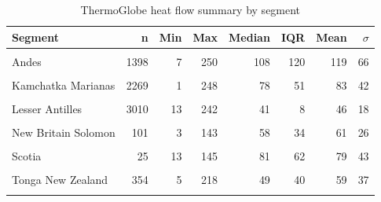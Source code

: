 \begin{table}

\caption{\label{tab:hfSummaryTable}ThermoGlobe heat flow summary by segment}
\centering
\begin{threeparttable}
\begin{tabular}[t]{lrrrrrrr}
\toprule
Segment & n & Min & Max & Median & IQR & Mean & $\sigma$\\
\midrule
\cellcolor{gray!6}{Alaska Aleutians} & \cellcolor{gray!6}{290} & \cellcolor{gray!6}{6} & \cellcolor{gray!6}{196} & \cellcolor{gray!6}{66} & \cellcolor{gray!6}{27} & \cellcolor{gray!6}{71} & \cellcolor{gray!6}{28}\\
Andes & 1398 & 7 & 250 & 108 & 120 & 119 & 66\\
\cellcolor{gray!6}{Central America} & \cellcolor{gray!6}{1443} & \cellcolor{gray!6}{8} & \cellcolor{gray!6}{250} & \cellcolor{gray!6}{89} & \cellcolor{gray!6}{123} & \cellcolor{gray!6}{110} & \cellcolor{gray!6}{67}\\
Kamchatka Marianas & 2269 & 1 & 248 & 78 & 51 & 83 & 42\\
\cellcolor{gray!6}{Kyushu Ryukyu} & \cellcolor{gray!6}{1895} & \cellcolor{gray!6}{3} & \cellcolor{gray!6}{250} & \cellcolor{gray!6}{76} & \cellcolor{gray!6}{42} & \cellcolor{gray!6}{84} & \cellcolor{gray!6}{42}\\
Lesser Antilles & 3010 & 13 & 242 & 41 & 8 & 46 & 18\\
\cellcolor{gray!6}{N Philippines} & \cellcolor{gray!6}{568} & \cellcolor{gray!6}{3} & \cellcolor{gray!6}{231} & \cellcolor{gray!6}{71} & \cellcolor{gray!6}{26} & \cellcolor{gray!6}{75} & \cellcolor{gray!6}{33}\\
New Britain Solomon & 101 & 3 & 143 & 58 & 34 & 61 & 26\\
\cellcolor{gray!6}{S Philippines} & \cellcolor{gray!6}{460} & \cellcolor{gray!6}{1} & \cellcolor{gray!6}{224} & \cellcolor{gray!6}{71} & \cellcolor{gray!6}{32} & \cellcolor{gray!6}{74} & \cellcolor{gray!6}{34}\\
Scotia & 25 & 13 & 145 & 81 & 62 & 79 & 43\\
\cellcolor{gray!6}{Sumatra Banda Sea} & \cellcolor{gray!6}{1418} & \cellcolor{gray!6}{1} & \cellcolor{gray!6}{247} & \cellcolor{gray!6}{59} & \cellcolor{gray!6}{63} & \cellcolor{gray!6}{68} & \cellcolor{gray!6}{42}\\
Tonga New Zealand & 354 & 5 & 218 & 49 & 40 & 59 & 37\\
\cellcolor{gray!6}{Vanuatu} & \cellcolor{gray!6}{137} & \cellcolor{gray!6}{2} & \cellcolor{gray!6}{223} & \cellcolor{gray!6}{61} & \cellcolor{gray!6}{62} & \cellcolor{gray!6}{80} & \cellcolor{gray!6}{52}\\

\end{tabular}
\end{threeparttable}
\end{table}
